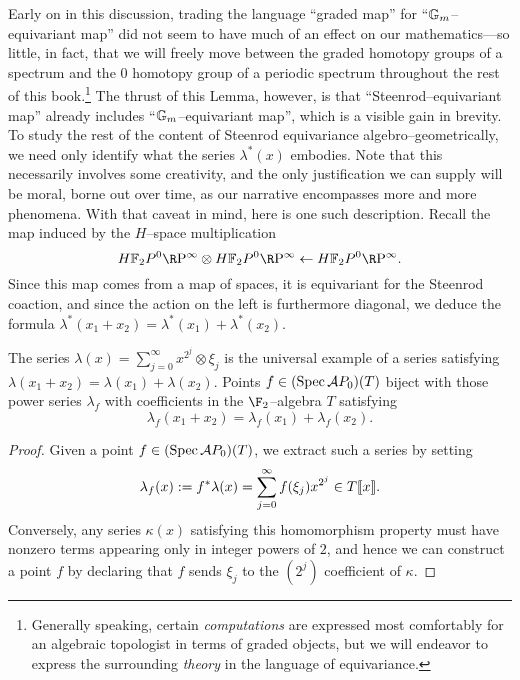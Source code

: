 Early on in this discussion, trading the language ``graded map'' for ``\(\mathbb G_m\)--equivariant map'' did not seem to have much of an effect on our mathematics---so little, in fact, that we will freely move between the graded homotopy groups of a spectrum and the \(0\){\th} homotopy group of a periodic spectrum throughout the rest of this book.\footnote{Generally speaking, certain \emph{computations} are expressed most comfortably for an algebraic topologist in terms of graded objects, but we will endeavor to express the surrounding \emph{theory} in the language of equivariance.}  The thrust of this Lemma, however, is that ``Steenrod--equivariant map'' already includes ``\(\mathbb G_m\)--equivariant map'', which is a visible gain in brevity.  To study the rest of the content of Steenrod equivariance algebro--geometrically, we need only identify what the series \(\lambda^*(x)\) embodies.  Note that this necessarily involves some creativity, and the only justification we can supply will be moral, borne out over time, as our narrative encompasses more and more phenomena.  With that caveat in mind, here is one such description.  Recall the map induced by the \(H\)--space multiplication \[\HFtwo P^0 \RP^\infty \otimes \HFtwo P^0 \RP^\infty \leftarrow \HFtwo P^0 \RP^\infty.\]  Since this map comes from a map of spaces, it is equivariant for the Steenrod coaction, and since the action on the left is furthermore diagonal, we deduce the formula \(\lambda^*(x_1 + x_2) = \lambda^*(x_1) + \lambda^*(x_2)\).

\begin{lemma}\label{SteenrodAlgIdentifiedWithAutGa}
The series \(\lambda(x) = \sum_{j=0}^\infty x^{2^j} \otimes \xi_j\) is the universal example of a series satisfying \(\lambda(x_1 + x_2) = \lambda(x_1) + \lambda(x_2)\).  Points \(f \in (\operatorname{Spec} \mathcal AP_0)(T)\) biject with those power series \(\lambda_f\) with coefficients in the \(\F_2\)--algebra \(T\) satisfying \[\lambda_f(x_1 + x_2) = \lambda_f(x_1) + \lambda_f(x_2).\]
\end{lemma}
\begin{proof}
Given a point \(f \in (\operatorname{Spec} \mathcal AP_0)(T)\), we extract such a series by setting \[\lambda_f(x) := f^* \lambda(x) = \sum_{j=0}^\infty f(\xi_j) x^{2^j} \in T\llbracket{x}\rrbracket.\]  Conversely, any series \(\kappa(x)\) satisfying this homomorphism property must have nonzero terms appearing only in integer powers of \(2\), and hence we can construct a point \(f\) by declaring that \(f\) sends \(\xi_j\) to the \((2^j)\){\th} coefficient of \(\kappa\).
\end{proof}

